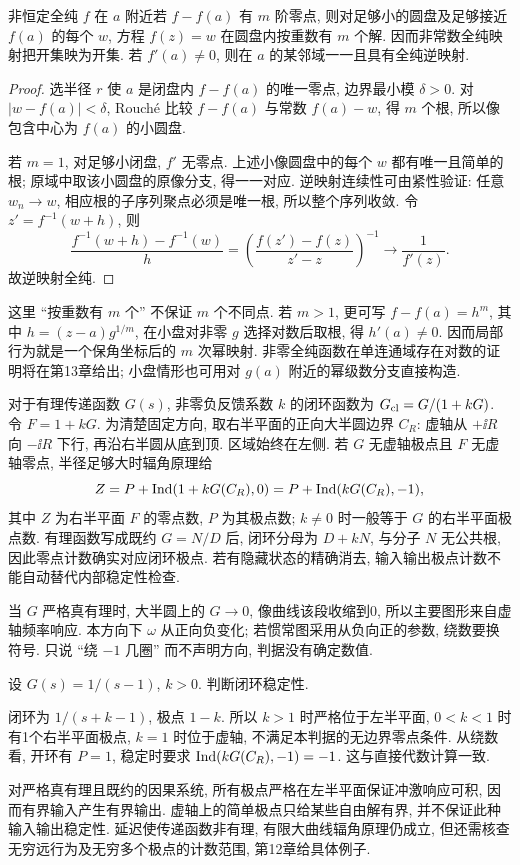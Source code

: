 \begin{theorem}\label{thm:localmap}
非恒定全纯 $f$ 在 $a$ 附近若 $f-f(a)$ 有 $m$ 阶零点, 则对足够小的圆盘及足够接近 $f(a)$ 的每个 $w$, 方程 $f(z)=w$ 在圆盘内按重数有 $m$ 个解. 因而非常数全纯映射把开集映为开集. 若 $f'(a)\ne0$, 则在 $a$ 的某邻域一一且具有全纯逆映射.
\end{theorem}
\begin{proof}
选半径 $r$ 使 $a$ 是闭盘内 $f-f(a)$ 的唯一零点, 边界最小模 $\delta>0$. 对 $|w-f(a)|<\delta$, Rouché 比较 $f-f(a)$ 与常数 $f(a)-w$, 得 $m$ 个根, 所以像包含中心为 $f(a)$ 的小圆盘.

若 $m=1$, 对足够小闭盘, $f'$ 无零点. 上述小像圆盘中的每个 $w$ 都有唯一且简单的根; 原域中取该小圆盘的原像分支, 得一一对应. 逆映射连续性可由紧性验证: 任意 $w_n\to w$, 相应根的子序列聚点必须是唯一根, 所以整个序列收敛. 令 $z'=f^{-1}(w+h)$, 则
\[
\frac{f^{-1}(w+h)-f^{-1}(w)}h
 =\left(\frac{f(z')-f(z)}{z'-z}\right)^{-1}\longrightarrow\frac1{f'(z)}.
\]
故逆映射全纯.
\end{proof}
这里 ``按重数有 $m$ 个'' 不保证 $m$ 个不同点. 若 $m>1$, 更可写 $f-f(a)=h^m$, 其中 $h=(z-a)g^{1/m}$, 在小盘对非零 $g$ 选择对数后取根, 得 $h'(a)\ne0$. 因而局部行为就是一个保角坐标后的 $m$ 次幂映射. 非零全纯函数在单连通域存在对数的证明将在第13章给出; 小盘情形也可用对 $g(a)$ 附近的幂级数分支直接构造.

对于有理传递函数 $G(s)$, 非零负反馈系数 $k$ 的闭环函数为 $G_{\rm cl}=G/(1+kG)$. 令 $F=1+kG$. 为清楚固定方向, 取右半平面的正向大半圆边界 $C_R$: 虚轴从 $+\ii R$ 向 $-\ii R$ 下行, 再沿右半圆从底到顶. 区域始终在左侧. 若 $G$ 无虚轴极点且 $F$ 无虚轴零点, 半径足够大时辐角原理给
\[
Z=P+\operatorname{Ind}(1+kG(C_R),0)=P+\operatorname{Ind}(kG(C_R),-1),
\]
其中 $Z$ 为右半平面 $F$ 的零点数, $P$ 为其极点数; $k\ne0$ 时一般等于 $G$ 的右半平面极点数. 有理函数写成既约 $G=N/D$ 后, 闭环分母为 $D+kN$, 与分子 $N$ 无公共根, 因此零点计数确实对应闭环极点. 若有隐藏状态的精确消去, 输入输出极点计数不能自动替代内部稳定性检查.

当 $G$ 严格真有理时, 大半圆上的 $G\to0$, 像曲线该段收缩到0, 所以主要图形来自虚轴频率响应. 本方向下 $\omega$ 从正向负变化; 若惯常图采用从负向正的参数, 绕数要换符号. 只说 ``绕 $-1$ 几圈'' 而不声明方向, 判据没有确定数值.
\begin{example}
设 $G(s)=1/(s-1)$, $k>0$. 判断闭环稳定性.
\end{example}
\begin{solution}
闭环为 $1/(s+k-1)$, 极点 $1-k$. 所以 $k>1$ 时严格位于左半平面, $0<k<1$ 时有1个右半平面极点, $k=1$ 时位于虚轴, 不满足本判据的无边界零点条件. 从绕数看, 开环有 $P=1$, 稳定时要求 $\operatorname{Ind}(kG(C_R),-1)=-1$. 这与直接代数计算一致.
\end{solution}
对严格真有理且既约的因果系统, 所有极点严格在左半平面保证冲激响应可积, 因而有界输入产生有界输出. 虚轴上的简单极点只给某些自由解有界, 并不保证此种输入输出稳定性. 延迟使传递函数非有理, 有限大曲线辐角原理仍成立, 但还需核查无穷远行为及无穷多个极点的计数范围, 第12章给具体例子.

